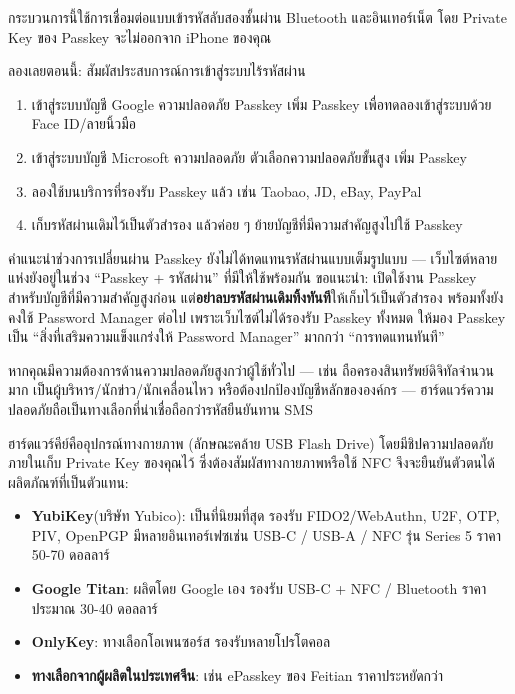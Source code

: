กระบวนการนี้ใช้การเชื่อมต่อแบบเข้ารหัสลับสองชั้นผ่าน Bluetooth และอินเทอร์เน็ต โดย Private Key ของ Passkey จะไม่ออกจาก iPhone ของคุณ

\begin{tcbpractice}{ลองเลยตอนนี้: สัมผัสประสบการณ์การเข้าสู่ระบบไร้รหัสผ่าน}
\begin{enumerate}
  \item เข้าสู่ระบบบัญชี Google ความปลอดภัย Passkey เพิ่ม Passkey เพื่อทดลองเข้าสู่ระบบด้วย Face ID/ลายนิ้วมือ
  \item เข้าสู่ระบบบัญชี Microsoft ความปลอดภัย ตัวเลือกความปลอดภัยขั้นสูง เพิ่ม Passkey
  \item ลองใช้บนบริการที่รองรับ Passkey แล้ว เช่น Taobao, JD, eBay, PayPal
  \item เก็บรหัสผ่านเดิมไว้เป็นตัวสำรอง แล้วค่อย ๆ ย้ายบัญชีที่มีความสำคัญสูงไปใช้ Passkey
\end{enumerate}

\end{tcbpractice}

\begin{tcbwarn}{คำแนะนำช่วงการเปลี่ยนผ่าน}
Passkey ยังไม่ได้ทดแทนรหัสผ่านแบบเต็มรูปแบบ — เว็บไซต์หลายแห่งยังอยู่ในช่วง “Passkey + รหัสผ่าน” ที่มีให้ใช้พร้อมกัน ขอแนะนำ: เปิดใช้งาน Passkey สำหรับบัญชีที่มีความสำคัญสูงก่อน แต่\textbf{อย่าลบรหัสผ่านเดิมทิ้งทันที}ให้เก็บไว้เป็นตัวสำรอง พร้อมทั้งยังคงใช้ Password Manager ต่อไป เพราะเว็บไซต์ไม่ได้รองรับ Passkey ทั้งหมด ให้มอง Passkey เป็น “สิ่งที่เสริมความแข็งแกร่งให้ Password Manager” มากกว่า “การทดแทนทันที”

\end{tcbwarn}


หากคุณมีความต้องการด้านความปลอดภัยสูงกว่าผู้ใช้ทั่วไป — เช่น ถือครองสินทรัพย์ดิจิทัลจำนวนมาก เป็นผู้บริหาร/นักข่าว/นักเคลื่อนไหว หรือต้องปกป้องบัญชีหลักขององค์กร — ฮาร์ดแวร์ความปลอดภัยถือเป็นทางเลือกที่น่าเชื่อถือกว่ารหัสยืนยันทาน SMS


ฮาร์ดแวร์คีย์คืออุปกรณ์ทางกายภาพ (ลักษณะคล้าย USB Flash Drive) โดยมีชิปความปลอดภัยภายในเก็บ Private Key ของคุณไว้ ซึ่งต้องสัมผัสทางกายภาพหรือใช้ NFC จึงจะยืนยันตัวตนได้ ผลิตภัณฑ์ที่เป็นตัวแทน:

\begin{itemize}
  \item \textbf{YubiKey}(บริษัท Yubico): เป็นที่นิยมที่สุด รองรับ FIDO2/WebAuthn, U2F, OTP, PIV, OpenPGP มีหลายอินเทอร์เฟซเช่น USB-C / USB-A / NFC รุ่น Series 5 ราคา 50-70 ดอลลาร์
  \item \textbf{Google Titan}: ผลิตโดย Google เอง รองรับ USB-C + NFC / Bluetooth ราคาประมาณ 30-40 ดอลลาร์
  \item \textbf{OnlyKey}: ทางเลือกโอเพนซอร์ส รองรับหลายโปรโตคอล
  \item \textbf{ทางเลือกจากผู้ผลิตในประเทศจีน}: เช่น ePasskey ของ Feitian ราคาประหยัดกว่า
\end{itemize}

